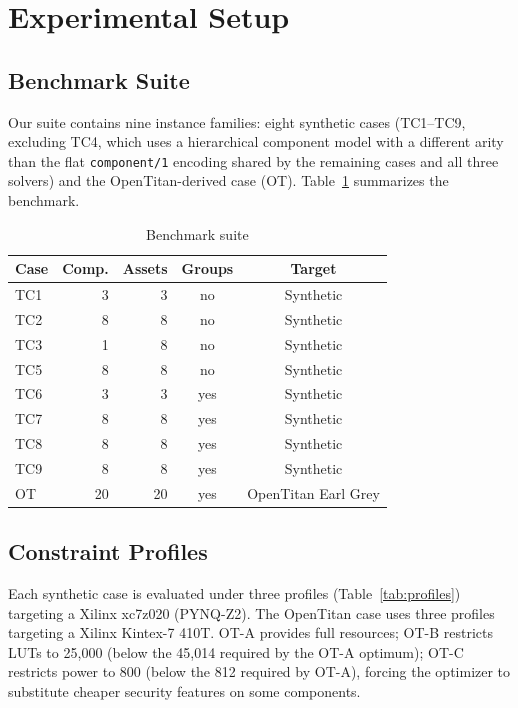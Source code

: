\documentclass[conference]{IEEEtran}
\begin{document}
\section{Experimental Setup}

\subsection{Benchmark Suite}

Our suite contains nine instance families: eight synthetic cases (TC1--TC9,
excluding TC4, which uses a hierarchical component model with a different
arity than the flat \texttt{component/1} encoding shared by the remaining
cases and all three solvers) and the OpenTitan-derived case (OT).
Table~\ref{tab:suite} summarizes the benchmark.

\begin{table}[t]
\caption{Benchmark suite}
\label{tab:suite}
\centering
\footnotesize
\begin{tabular}{lrrcc}
\toprule
Case & Comp. & Assets & Groups & Target \\
\midrule
TC1  &  3 &  3 & no  & Synthetic \\
TC2  &  8 &  8 & no  & Synthetic \\
TC3  &  1 &  8 & no  & Synthetic \\
TC5  &  8 &  8 & no  & Synthetic \\
TC6  &  3 &  3 & yes & Synthetic \\
TC7  &  8 &  8 & yes & Synthetic \\
TC8  &  8 &  8 & yes & Synthetic \\
TC9  &  8 &  8 & yes & Synthetic \\
\midrule
OT   & 20 & 20 & yes & OpenTitan Earl Grey \\
\bottomrule
\end{tabular}
\end{table}

\subsection{Constraint Profiles}

Each synthetic case is evaluated under three profiles
(Table~\ref{tab:profiles}) targeting a Xilinx
xc7z020 (PYNQ-Z2). The OpenTitan case uses three profiles targeting a
Xilinx Kintex-7 410T. OT-A provides full resources; OT-B restricts LUTs to
25{,}000 (below the 45{,}014 required by the OT-A optimum); OT-C
restricts power to 800 (below the 812 required by OT-A), forcing
the optimizer to substitute cheaper security features on some components.
\end{document}
